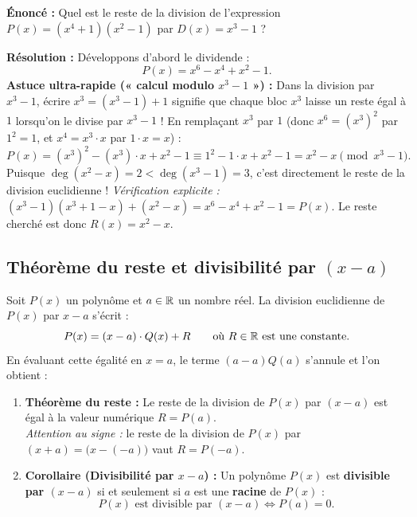 \begin{exemple}
\textbf{Énoncé :} Quel est le reste de la division de l'expression $P(x) = (x^4 + 1)(x^2 - 1)$ par $D(x) = x^3 - 1$ ?

\textbf{Résolution :} Développons d'abord le dividende :
\[
    P(x) = x^6 - x^4 + x^2 - 1.
\]
\textbf{Astuce ultra-rapide (« calcul modulo $x^3 - 1$ ») :} Dans la division par $x^3 - 1$, écrire $x^3 = (x^3 - 1) + 1$ signifie que chaque bloc $x^3$ laisse un reste égal à $1$ lorsqu'on le divise par $x^3 - 1$ ! En remplaçant $x^3$ par $1$ (donc $x^6 = (x^3)^2$ par $1^2 = 1$, et $x^4 = x^3 \cdot x$ par $1 \cdot x = x$) :
\[
    P(x) = (x^3)^2 - (x^3)\cdot x + x^2 - 1 \equiv 1^2 - 1\cdot x + x^2 - 1 = x^2 - x \pmod{x^3 - 1}.
\]
Puisque $\deg(x^2 - x) = 2 < \deg(x^3 - 1) = 3$, c'est directement le reste de la division euclidienne !
\emph{Vérification explicite :} $(x^3 - 1)(x^3 + 1 - x) + (x^2 - x) = x^6 - x^4 + x^2 - 1 = P(x)$.
Le reste cherché est donc $\boxed{R(x) = x^2 - x}$.
\end{exemple}

\subsection{Théorème du reste et divisibilité par $(x - a)$}

\begin{theoreme}
Soit $P(x)$ un polynôme et $a \in \mathbb{R}$ un nombre réel. La division euclidienne de $P(x)$ par $x - a$ s'écrit :
\[
    P(x) = (x - a)\cdot Q(x) + R \qquad \text{où } R \in \mathbb{R} \text{ est une constante}.
\]
En évaluant cette égalité en $x = a$, le terme $(a - a)Q(a)$ s'annule et l'on obtient :
\begin{enumerate}
    \item \textbf{Théorème du reste :} Le reste de la division de $P(x)$ par $(x - a)$ est égal à la valeur numérique $\boxed{R = P(a)}$.\\
    \emph{Attention au signe :} le reste de la division de $P(x)$ par $(x + a) = \bigl(x - (-a)\bigr)$ vaut $\boxed{R = P(-a)}$.
    \item \textbf{Corollaire (Divisibilité par $x - a$) :} Un polynôme $P(x)$ est \textbf{divisible par $(x - a)$} si et seulement si $a$ est une \textbf{racine} de $P(x)$ :
    \[
        \boxed{P(x) \text{ est divisible par } (x - a) \iff P(a) = 0}.
    \]
\end{enumerate}
\end{theoreme}

